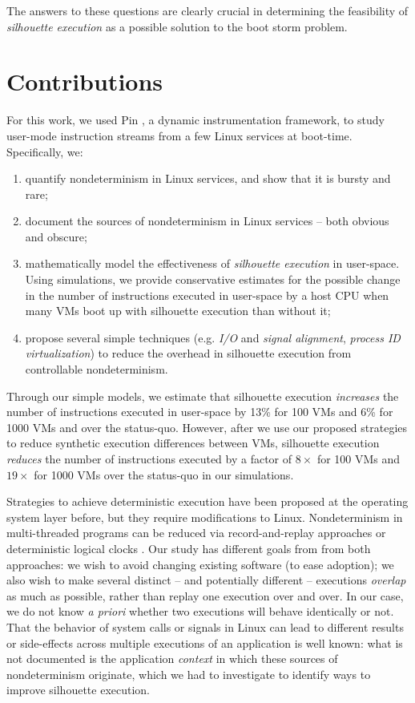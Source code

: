 The answers to these questions are clearly crucial in determining
the feasibility of \emph{silhouette execution} as a possible solution
to the boot storm problem. 

\section{Contributions}
For this work, we used Pin \cite{luk2005pin},
a dynamic instrumentation framework,
to study user-mode instruction streams from 
a few Linux services at boot-time. 
Specifically, we:
\begin {enumerate}
\item quantify nondeterminism in Linux services, and show that it is
  bursty and rare;
\item document the sources of nondeterminism in Linux services -- both obvious and obscure;
\item mathematically model the effectiveness
  of {\em silhouette execution} in user-space. Using simulations, we provide conservative estimates for the possible change in the number of instructions
  executed in user-space by a host CPU when many VMs boot up with silhouette execution than without it;
\item propose several simple techniques (e.g. {\em I/O} and {\em signal alignment}, {\em process ID virtualization})
  to reduce the overhead in silhouette execution from controllable nondeterminism.
\end {enumerate}

Through our simple models, we estimate that silhouette execution {\em increases} the number
of instructions executed in user-space by 13\% for 100 VMs and 6\% for 1000 VMs and 
over the status-quo. However, after we use our proposed strategies to reduce synthetic execution differences
between VMs, silhouette execution {\em reduces} the number of instructions executed
by a factor of $8\times$ for 100 VMs and $19\times$ for 1000 VMs over the status-quo 
in our simulations.

Strategies to achieve deterministic execution have been proposed at the operating system layer \cite{bergan2010dos} before,
but they require modifications to Linux. Nondeterminism in multi-threaded programs 
can be reduced via record-and-replay approaches \cite{patil2010pinplay} or deterministic logical clocks \cite{marek2011scaling}. 
Our study has different goals from from both approaches: we wish to avoid changing existing 
software (to ease adoption); we also wish to make several distinct -- and potentially different -- executions \emph{overlap} as much as possible, 
rather than replay one execution over and over.
In our case, we do not know \emph{a priori} whether two executions 
will behave identically or not. That the behavior of system calls or signals in Linux can lead to different results or side-effects across
multiple executions of an application is well known: what is not documented is the application \emph{context} in
which these sources of nondeterminism originate, which we had to investigate to identify
ways to improve silhouette execution. \newline

